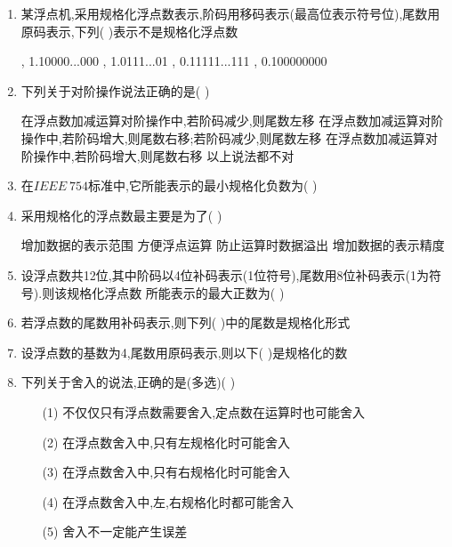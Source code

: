 \documentclass[12pt, a4paper, oneside, UTF8]{ctexbook}
\begin{document}
\begin{enumerate}
    \item 某浮点机,采用规格化浮点数表示,阶码用移码表示(最高位表示符号位),尾数用原码表示,下列(   )表示不是规格化浮点数 
    \begin{choices}[2]
        , 1.10000...000
        , 1.0111...01
        , 0.11111...111
        , 0.100000000 
    \end{choices}


    \item 下列关于对阶操作说法正确的是(   ) 
    \begin{choices}[1]
        \task 在浮点数加减运算对阶操作中,若阶码减少,则尾数左移
        \task 在浮点数加减运算对阶操作中,若阶码增大,则尾数右移;若阶码减少,则尾数左移
        \task 在浮点数加减运算对阶操作中,若阶码增大,则尾数右移
        \task 以上说法都不对
    \end{choices}


    \item 在$IEEE\ 754$标准中,它所能表示的最小规格化负数为(    )

    \item 采用规格化的浮点数最主要是为了(   ) 
    \begin{choices}[2]
        \task 增加数据的表示范围
        \task 方便浮点运算
        \task 防止运算时数据溢出
        \task 增加数据的表示精度 
    \end{choices}


    \item 设浮点数共12位,其中阶码以4位补码表示(1位符号),尾数用8位补码表示(1为符号).则该规格化浮点数
    所能表示的最大正数为(    ) 

    \item 若浮点数的尾数用补码表示,则下列(   )中的尾数是规格化形式 
    \begin{choices}
    \end{choices}
    

    \item 设浮点数的基数为4,尾数用原码表示,则以下(   )是规格化的数 
    \begin{choices}
    \end{choices}
    

    \item 下列关于舍入的说法,正确的是(多选)(   )
    \begin{enumerate}
        \item [(1)] 不仅仅只有浮点数需要舍入,定点数在运算时也可能舍入 
        \item [(2)] 在浮点数舍入中,只有左规格化时可能舍入
        \item [(3)] 在浮点数舍入中,只有右规格化时可能舍入
        \item [(4)] 在浮点数舍入中,左,右规格化时都可能舍入
        \item [(5)] 舍入不一定能产生误差
    \end{enumerate}


\end{enumerate}
\end{document}
